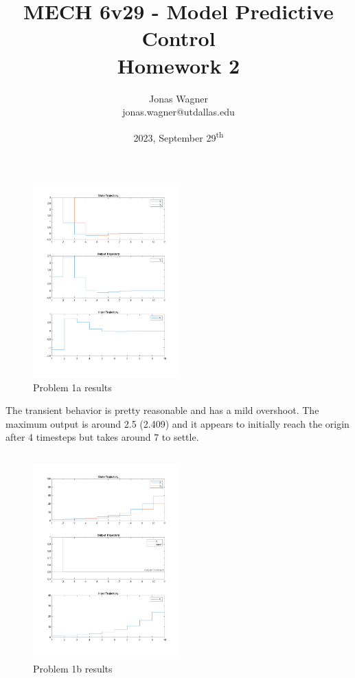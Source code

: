 \documentclass[]{article}
\title{
    MECH 6v29 - Model Predictive Control\\ 
    Homework 2
}
\author{Jonas Wagner\\ jonas.wagner@utdallas.edu}
\date{2023, September 29\textsuperscript{th}}
\begin{document}
\maketitle

\tableofcontents

\newpage
\section{}

\subsection{}

\begin{figure}[h]
    \centering
    \includegraphics[width = 0.5\textwidth]{figs/pblm1a.png}
    \caption{Problem 1a results}
\end{figure}

The transient behavior is pretty reasonable and has a mild overshoot.
The maximum output is around 2.5 (2.409) and it appears to initially reach the origin after 4 timesteps but takes around 7 to settle.

\newpage
\subsection{}
\begin{figure}[h]
    \centering
    \includegraphics[width = 0.5\textwidth]{figs/pblm1b.png}
    \caption{Problem 1b results}
\end{figure}
\end{document}
